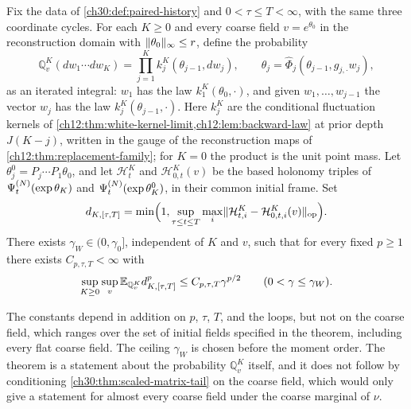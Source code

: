 \begin{theorem}\label{ch30:thm:terminal-frozen-matrix-tail}
Fix the data of \cref{ch30:def:paired-history} and $0<\tau\le T<\infty$, with the same three coordinate cycles. For each $K\ge0$ and every coarse field $v=e^{\theta_0}$ in the reconstruction domain with $\lVert \theta_0\rVert_\infty\le r$, define the probability
\[
 \mathbb Q_v^K(dw_1\cdots dw_K)=\prod_{j=1}^Kk_j^K(\theta_{j-1},dw_j),\qquad\theta_j=\widehat\Phi_j(\theta_{j-1},g_{j,\cdot}w_j),
\]
as an iterated integral: $w_1$ has the law $k_1^K(\theta_0,\cdot)$, and given $w_1,\ldots,w_{j-1}$ the vector $w_j$ has the law $k_j^K(\theta_{j-1},\cdot)$. Here $k_j^K$ are the conditional fluctuation kernels of \cref{ch12:thm:white-kernel-limit,ch12:lem:backward-law} at prior depth $J(K-j)$, written in the gauge of the reconstruction maps of \cref{ch12:thm:replacement-family}; for $K=0$ the product is the unit point mass. Let $\theta_j^0=P_j\cdots P_1\theta_0$, and let $\mathcal H^K_t$ and $\mathcal H^K_{0,t}(v)$ be the based holonomy triples of $\Psi^{(N)}_t(\exp\theta_K)$ and $\Psi^{(N)}_t(\exp\theta_K^0)$, in their common initial frame. Set
\[
 d_{K,[\tau,T]}=\min\Bigl(1,\sup_{\tau\le t\le T}\max_i\lVert \mathcal H_{t,i}^K-\mathcal H_{0,t,i}^K(v)\rVert_{\mathrm{op}}\Bigr).
\]
There exists $\gamma_W\in(0,\gamma_0]$, independent of $K$ and $v$, such that for every fixed $p\ge1$ there exists $C_{p,\tau,T}<\infty$ with
\[
 \sup_{K\ge0}\sup_v\mathbb E_{\mathbb Q_v^K}d_{K,[\tau,T]}^p\le C_{p,\tau,T}\gamma^{p/2}\qquad(0<\gamma\le\gamma_W).
\]
\end{theorem}

The constants depend in addition on $p$, $\tau$, $T$, and the loops, but not on the coarse field, which ranges over the set of initial fields specified in the theorem, including every flat coarse field. The ceiling $\gamma_W$ is chosen before the moment order. The theorem is a statement about the probability $\mathbb Q_v^K$ itself, and it does not follow by conditioning \cref{ch30:thm:scaled-matrix-tail} on the coarse field, which would only give a statement for almost every coarse field under the coarse marginal of $\nu$.

